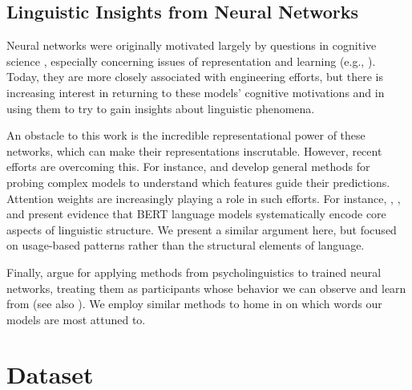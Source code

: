 \documentclass[11pt,a4paper]{article}
\begin{document}
\subsection{Linguistic Insights from Neural Networks}

Neural networks were originally motivated largely by questions in cognitive science \citep{pater2019generative}, especially concerning issues of representation and learning (e.g., \citealt{rumelhart1986learning,tesar2000learnability}). Today, they are more closely associated with engineering efforts, but there is increasing interest in returning to these models' cognitive motivations and in using them to try to gain insights about linguistic phenomena.

An obstacle to this work is the incredible representational power of these networks, which can make their representations inscrutable. However, recent efforts are overcoming this. For instance, \citet{N16-3020} and \citet{Koh:Liang:2017} develop general methods for probing complex models to understand which features  guide their predictions. Attention weights are increasingly playing a role in such efforts. For instance, \citet{jawahar-etal-2019-bert}, \citet{clark2019what}, and \citet{tenney-etal-2019-bert} present evidence that BERT language models systematically encode core aspects of linguistic structure. We present a similar argument here, but focused on usage-based patterns rather than the structural elements of language.

Finally, \citet{linzen-etal-2016-assessing} argue for applying methods from psycholinguistics to trained neural networks, treating them as participants whose behavior we can observe and learn from (see also \citealt{gulordava-etal-2018-colorless,Futrell-etal:2019}). We employ similar methods to home in on which words our models are most attuned to.


\section{Dataset}\label{sec:dataset}
\end{document}
